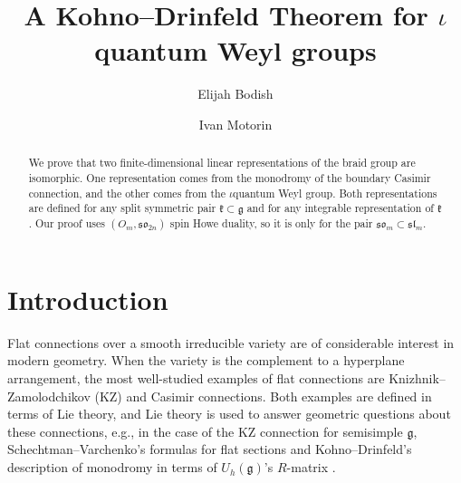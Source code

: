 \documentclass[10pt]{amsart}
\numberwithin{equation}{section}
\theoremstyle{definition}
\newcommand{\son}[1][2n]{\mathfrak{so}_{#1}}
\newcommand{\g}{\mathfrak{g}}
\begin{document}
%


\title[]{A Kohno--Drinfeld Theorem for $\iota$quantum Weyl groups}

\author{Elijah Bodish}
\address{Department of Mathematics, Indiana University Bloomington, Rawles Hall, Bloomington, IN 47405-47405-7000, USA}

\author{Ivan Motorin}
\address{Department of Mathematics, Massachusetts Institute of Technology, Building 2, Cambridge, MA 02139-4307, USA}

\begin{abstract}
We prove that two finite-dimensional linear representations of the braid group are isomorphic. One representation comes from the monodromy of the boundary Casimir connection, and the other comes from the $\iota$quantum Weyl group. Both representations are defined for any split symmetric pair $\mathfrak{k}\subset \g$ and for any integrable representation of $\mathfrak{k}$. Our proof uses $(O_m,\son[2n])$ spin Howe duality, so it is only for the pair $\mathfrak{so}_m\subset \mathfrak{sl}_m$.
\end{abstract}

\maketitle

\setcounter{tocdepth}{3}


%
\section{Introduction}
%

Flat connections over a smooth irreducible variety are of considerable interest in modern geometry. When the variety is the complement to a hyperplane arrangement, the most well-studied examples of flat connections are Knizhnik--Zamolodchikov (KZ) \cite{MR853258} and Casimir \cite{MR1797943,MR1926499} connections. Both examples are defined in terms of Lie theory, and Lie theory is used to answer geometric questions about these connections, e.g., in the case of the KZ connection for semisimple $\g$, Schechtman--Varchenko's formulas for flat sections \cite{MR1123378} and Kohno--Drinfeld's description of monodromy in terms of $U_h(\g)$'s $R$-matrix \cite{Drinfeld2,Koh1}. 
\end{document}
